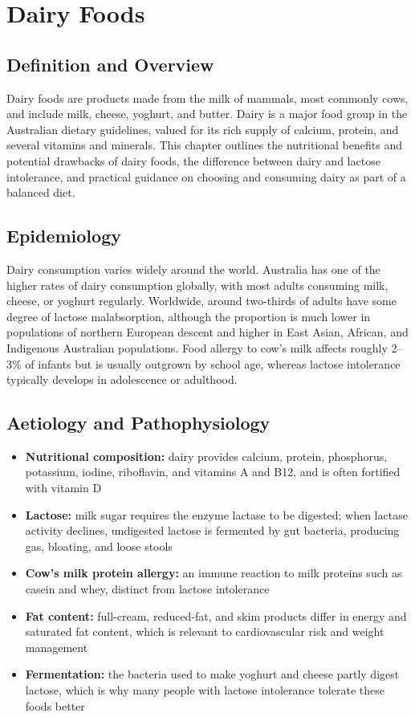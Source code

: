 \chapter{Dairy Foods}

\section*{Definition and Overview}
Dairy foods are products made from the milk of mammals, most commonly cows, and include milk, cheese, yoghurt, and butter. Dairy is a major food group in the Australian dietary guidelines, valued for its rich supply of calcium, protein, and several vitamins and minerals. This chapter outlines the nutritional benefits and potential drawbacks of dairy foods, the difference between dairy and lactose intolerance, and practical guidance on choosing and consuming dairy as part of a balanced diet.

\section*{Epidemiology}
Dairy consumption varies widely around the world. Australia has one of the higher rates of dairy consumption globally, with most adults consuming milk, cheese, or yoghurt regularly. Worldwide, around two-thirds of adults have some degree of lactose malabsorption, although the proportion is much lower in populations of northern European descent and higher in East Asian, African, and Indigenous Australian populations. Food allergy to cow's milk affects roughly 2--3\% of infants but is usually outgrown by school age, whereas lactose intolerance typically develops in adolescence or adulthood.

\section*{Aetiology and Pathophysiology}
\begin{itemize}
    \item \textbf{Nutritional composition:} dairy provides calcium, protein, phosphorus, potassium, iodine, riboflavin, and vitamins A and B12, and is often fortified with vitamin D
    \item \textbf{Lactose:} milk sugar requires the enzyme lactase to be digested; when lactase activity declines, undigested lactose is fermented by gut bacteria, producing gas, bloating, and loose stools
    \item \textbf{Cow's milk protein allergy:} an immune reaction to milk proteins such as casein and whey, distinct from lactose intolerance
    \item \textbf{Fat content:} full-cream, reduced-fat, and skim products differ in energy and saturated fat content, which is relevant to cardiovascular risk and weight management
    \item \textbf{Fermentation:} the bacteria used to make yoghurt and cheese partly digest lactose, which is why many people with lactose intolerance tolerate these foods better
\end{itemize}

